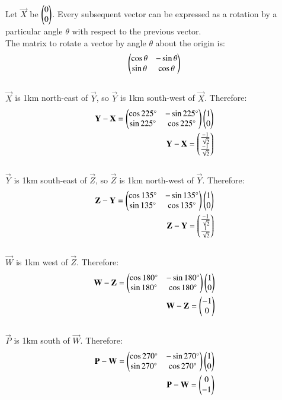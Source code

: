 \documentclass[12pt]{article}
\begin{document}
Let $\vec{X}$ be $\begin{pmatrix}0\\0\end{pmatrix}$. Every subsequent vector can be expressed as a rotation by a particular angle $\theta$ with respect to the previous vector.\\
The matrix to rotate a vector by angle $\theta$ about the origin is:
\begin{align}
\begin{pmatrix}\cos\theta & -\sin\theta \\ \sin\theta & \cos\theta\end{pmatrix}
\end{align}\\
$\vec{X}$ is 1km north-east of $\vec{Y}$, so $\vec{Y}$ is 1km south-west of $\vec{X}$. Therefore:\begin{align}
\mathbf{Y}-\mathbf{X} = \begin{pmatrix}\cos225\degree & -\sin225\degree \\ \sin225\degree & \cos225\degree\end{pmatrix}\begin{pmatrix}1\\0\end{pmatrix}\\
\mathbf{Y}-\mathbf{X} = \begin{pmatrix}\frac{-1}{\sqrt{2}}\\\frac{-1}{\sqrt{2}}\end{pmatrix}
\end{align}\\
$\vec{Y}$ is 1km south-east of $\vec{Z}$, so $\vec{Z}$ is 1km north-west of $\vec{Y}$. Therefore:\begin{align}
\mathbf{Z}-\mathbf{Y} = \begin{pmatrix}\cos135\degree & -\sin135\degree \\ \sin135\degree & \cos135\degree\end{pmatrix}\begin{pmatrix}1\\0\end{pmatrix}\\
\mathbf{Z}-\mathbf{Y} = \begin{pmatrix}\frac{-1}{\sqrt{2}}\\\frac{1}{\sqrt{2}}\end{pmatrix}
\end{align}\\
$\vec{W}$ is 1km west of $\vec{Z}$. Therefore:\begin{align}
\mathbf{W}-\mathbf{Z} = \begin{pmatrix}\cos180\degree & -\sin180\degree \\ \sin180\degree & \cos180\degree\end{pmatrix}\begin{pmatrix}1\\0\end{pmatrix}\\
\mathbf{W}-\mathbf{Z} = \begin{pmatrix}-1\\0\end{pmatrix}
\end{align}\\
$\vec{P}$ is 1km south of $\vec{W}$. Therefore:\begin{align}
\mathbf{P}-\mathbf{W} = \begin{pmatrix}\cos270\degree & -\sin270\degree \\ \sin270\degree & \cos270\degree\end{pmatrix}\begin{pmatrix}1\\0\end{pmatrix}\\
\mathbf{P}-\mathbf{W} = \begin{pmatrix}0\\-1\end{pmatrix}
\end{align}\\
\end{document}
